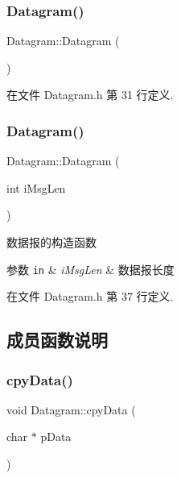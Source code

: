 \subsubsection{\texorpdfstring{Datagram()}{Datagram()}\hspace{0.1cm}{\footnotesize\ttfamily [1/2]}}
{\footnotesize\ttfamily Datagram\+::\+Datagram (\begin{DoxyParamCaption}{ }\end{DoxyParamCaption})\hspace{0.3cm}{\ttfamily [inline]}}



在文件 Datagram.\+h 第 31 行定义.

\mbox{\label{class_datagram_a4f1b9ef3e5a00a11e9b206665c5968dd}} 
\subsubsection{\texorpdfstring{Datagram()}{Datagram()}\hspace{0.1cm}{\footnotesize\ttfamily [2/2]}}
{\footnotesize\ttfamily Datagram\+::\+Datagram (\begin{DoxyParamCaption}\item[{int}]{i\+Msg\+Len }\end{DoxyParamCaption})\hspace{0.3cm}{\ttfamily [inline]}}



数据报的构造函数 


\begin{DoxyParams}[1]{参数}
\mbox{\tt in}  & {\em i\+Msg\+Len} & 数据报长度 \\
\hline
\end{DoxyParams}


在文件 Datagram.\+h 第 37 行定义.



\subsection{成员函数说明}
\mbox{\label{class_datagram_afd6c80ab2f1f89bf6883bc552777668f}} 
\subsubsection{\texorpdfstring{cpy\+Data()}{cpyData()}}
{\footnotesize\ttfamily void Datagram\+::cpy\+Data (\begin{DoxyParamCaption}\item[{char $\ast$}]{p\+Data }\end{DoxyParamCaption})}



